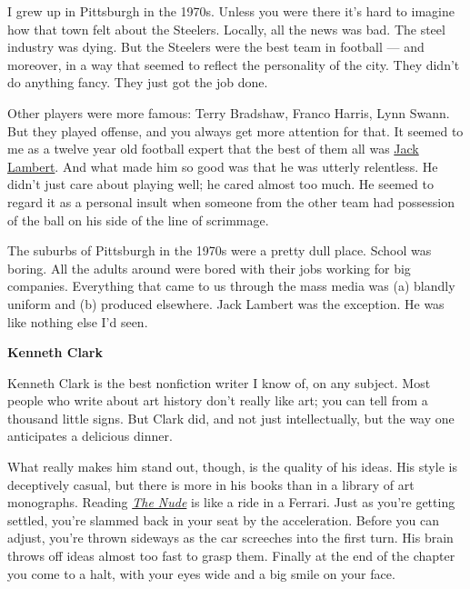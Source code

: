 I grew up in Pittsburgh in the
                  1970s. Unless you were there it's hard to imagine how that
                  town felt about the Steelers. Locally, all the news was bad.
                  The steel industry was dying. But the Steelers were the best
                  team in football --- and moreover, in a way that seemed to
                  reflect the personality of the city. They didn't do anything
                  fancy. They just got the job done.

Other players
                  were more famous: Terry Bradshaw, Franco Harris, Lynn Swann.
                  But they played offense, and you always get more attention for
                  that. It seemed to me as a twelve year old football expert
                  that the best of them all was
                  \href{http://en.wikipedia.org/wiki/Jack\_Lambert\_(American\_football\_player)}{Jack Lambert}. And what made him so good was that he was utterly
                  relentless. He didn't just care about playing well; he cared
                  almost too much. He seemed to regard it as a personal insult
                  when someone from the other team had possession of the ball on
                  his side of the line of scrimmage.

The suburbs of
                  Pittsburgh in the 1970s were a pretty dull place. School was
                  boring. All the adults around were bored with their jobs
                  working for big companies. Everything that came to us through
                  the mass media was (a) blandly uniform and (b) produced
                  elsewhere. Jack Lambert was the exception. He was like nothing
                  else I'd seen.


                  \textbf{Kenneth Clark}

Kenneth Clark is the best
                  nonfiction writer I know of, on any subject. Most people who
                  write about art history don't really like art; you can tell
                  from a thousand little signs. But Clark did, and not just
                  intellectually, but the way one anticipates a delicious
                  dinner.

What really makes him stand out, though, is
                  the quality of his ideas. His style is deceptively casual, but
                  there is more in his books than in a library of art
                  monographs. Reading
                  \href{http://www.amazon.com/Nude-Study-Ideal-Form/dp/0691017883}{\emph{The Nude}}
                  is like a ride in a Ferrari. Just as you're getting settled,
                  you're slammed back in your seat by the acceleration. Before
                  you can adjust, you're thrown sideways as the car screeches
                  into the first turn. His brain throws off ideas almost too
                  fast to grasp them. Finally at the end of the chapter you come
                  to a halt, with your eyes wide and a big smile on your
                  face.

